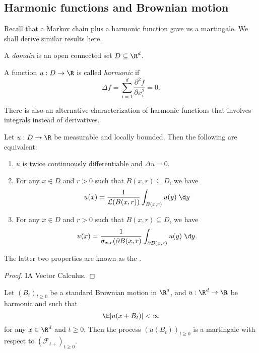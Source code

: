 \documentclass[a4paper]{article}
\begin{document}
\subsection{Harmonic functions and Brownian motion}
Recall that a Markov chain plus a harmonic function gave us a martingale. We shall derive similar results here.

\begin{defi}[Domain]
  A \emph{domain} is an open connected set $D \subseteq \R^d$.
\end{defi}

\begin{defi}
  A function $u: D \to \R$ is called \emph{harmonic} if\index{$\Delta$}
  \[
    \Delta f = \sum_{i = 1}^d \frac{\partial^2 f}{\partial x_i^2} = 0.
  \]
\end{defi}

There is also an alternative characterization of harmonic functions that involves integrals instead of derivatives.
\begin{lemma}
  Let $u: D \to \R$ be measurable and locally bounded. Then the following are equivalent:
  \begin{enumerate}
    \item $u$ is twice continuously differentiable and $\Delta u = 0$.
    \item For any $x \in D$ and $r > 0$ such that $B(x, r) \subseteq D$, we have
      \[
        u(x) = \frac{1}{\mathcal{L}(B(x, r))} \int_{B(x, r)} u(y) \;\d y
      \]
    \item For any $x \in D$ and $r > 0$ such that $B(x, r) \subseteq D$, we have
      \[
        u(x) = \frac{1}{\sigma_{x, r}(\partial B(x, r)} \int_{\partial B(x, r)} u(y) \;\d y.
      \]
  \end{enumerate}
\end{lemma}
The latter two properties are known as the .

\begin{proof}
  IA Vector Calculus.
\end{proof}

\begin{thm}
  Let $(B_t)_{t \geq 0}$ be a standard Brownian motion in $\R^d$, and $u: \R^d \to \R$ be harmonic and such that
  \[
    \E |u(x + B_t)| < \infty
  \]
  for any $x \in \R^d$ and $t \geq 0$. Then the process $(u(B_t))_{t \geq 0}$ is a martingale with respect to $(\mathcal{F}_{t+})_{t \geq 0}$.
\end{thm}
\end{document}

